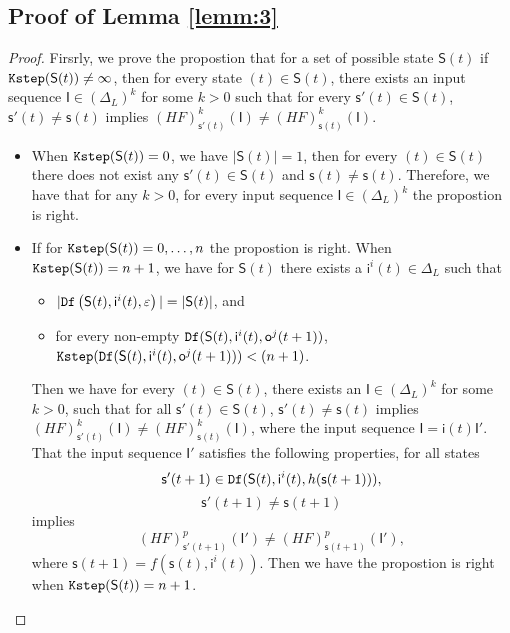 \begin{appendices}
\subsection{Proof of Lemma \ref{lemm:3}}
\begin{proof} Firsrly, we prove the propostion that for a set of possible state $\mathsf{S}(t)$ if ${\tt Kstep}(\mathsf{S}(t))\ne\infty$, then for every state \State$(t)\in \mathsf{S}(t)$, there exists an input sequence $\mathsf{I}\in(\Delta_L)^{k}$ for some $k >0$ such that for every $\mathsf{s}'(t)\in \mathsf{S}(t)$, $\mathsf{s}'(t)\neq \mathsf{s}(t)$ implies $(HF)^{k}_{\mathsf{s}'(t)}(\mathsf{I})\neq (HF)^{k}_{{\mathsf{s}(t)}}(\mathsf{I})$.
\begin{itemize}
\item When ${\tt Kstep}(\mathsf{S}(t))=0$, we have $|\mathsf{S}(t)|=1$, then for every \State$(t)$$\in \mathsf{S}(t)$ there does not exist any $\mathsf{s}'(t)\in \mathsf{S}(t)$ and $\mathsf{s}(t)\neq \mathsf{s}(t)$. Therefore, we have that for any $k >0$, for every input sequence $\mathsf{I}\in(\Delta_L)^{k}$ the propostion is right. 
\item If for ${\tt Kstep}(\mathsf{S}(t))=0,\ldots, n$ the propostion is right. When ${\tt Kstep}(\mathsf{S}(t))=n+1$, we have for $\mathsf{S}(t)$ there exists a $\mathsf{i}^{i}(t)\in \Delta_L$ such that
 \begin{itemize}
 \item  $|{\tt Df}\left(\mathsf{S}(t),\mathsf{i}^{i}(t),\varepsilon\right)|=|\mathsf{S}(t)|$, and 
 \item  for every non-empty ${\tt Df}(\mathsf{S}(t),\mathsf{i}^{i}(t),\mathsf{o}^{j}(t+1))$, ${\tt Kstep}({\tt Df}(\mathsf{S}(t),\mathsf{i}^{i}(t),\mathsf{o}^{j}(t+1)))<(n+1)$.
 \end{itemize}
 Then we have for every \State$(t)$$\in \mathsf{S}(t)$, there exists an $\mathsf{I}\in(\Delta_L)^{k}$ for some $k >0$, such that for all $\mathsf{s}'(t)\in \mathsf{S}(t)$, $\mathsf{s}'(t)\neq \mathsf{s}(t)$ implies $(HF)^{k}_{\mathsf{s}'(t)}(\mathsf{I})\neq (HF)^{k}_{{\mathsf{s}(t)}}(\mathsf{I})$, where the input sequence $\mathsf{I}=\mathsf{i}(t)\mathsf{I}'$. That the input sequence $\mathsf{I}'$ satisfies the following properties,
  for all states \[\mathsf{s}'(t+1)\in {\tt Df}(\mathsf{S}(t),\mathsf{i}^{i}(t),h(\mathsf{s}(t+1))),\]\[\mathsf{s}'(t+1)\neq \mathsf{s}(t+1)\] implies \[(HF)^p_{\mathsf{s}'(t+1)}(\mathsf{I}')\neq (HF)^p_{{\mathsf{s}(t+1)}}(\mathsf{I}'),\] where $\mathsf{s}(t+1)=f(\mathsf{s}(t),\mathsf{i}^{i}(t))$. Then we have the propostion is right when ${\tt Kstep}(\mathsf{S}(t))=n+1$. 


\end{itemize}
\end{proof}
\end{appendices}
